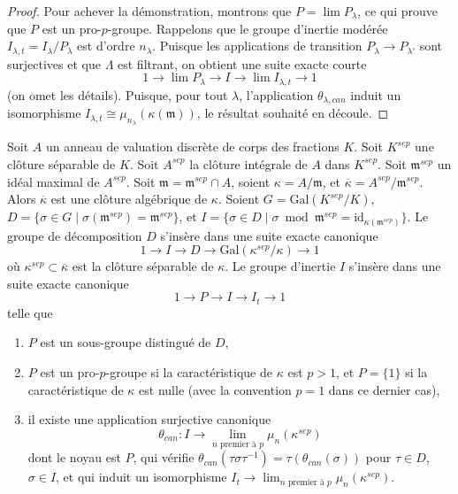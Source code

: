 \begin{proof}
\medskip\noindent
Pour achever la démonstration, montrons que $P = \lim P_\lambda$, ce qui prouve
que $P$ est un pro-$p$-groupe. Rappelons que le groupe d'inertie modérée
$I_{\lambda, t} = I_\lambda/P_\lambda$ est d'ordre $n_\lambda$.
Puisque les applications de transition $P_\lambda \to P_{\lambda'}$ sont surjectives
et que $\Lambda$ est filtrant, on obtient une suite exacte courte
$$
1 \to \lim P_\lambda \to I \to \lim I_{\lambda, t} \to 1
$$
(on omet les détails). Puisque, pour tout $\lambda$, l'application $\theta_{\lambda, can}$
induit un isomorphisme
$I_{\lambda, t} \cong \mu_{n_\lambda}(\kappa(\mathfrak m))$,
le résultat souhaité en découle.
\end{proof}

\begin{lemma}
\label{lemma-structure-decomposition-separable-closure}
Soit $A$ un anneau de valuation discrète de corps des fractions $K$.
Soit $K^{sep}$ une clôture séparable de $K$.
Soit $A^{sep}$ la clôture intégrale de $A$ dans $K^{sep}$.
Soit $\mathfrak m^{sep}$ un idéal maximal de $A^{sep}$.
Soit $\mathfrak m = \mathfrak m^{sep} \cap A$, soient
$\kappa = A/\mathfrak m$, et
$\overline{\kappa} = A^{sep}/\mathfrak m^{sep}$.
Alors $\overline{\kappa}$ est une clôture algébrique de $\kappa$.
Soient $G = \text{Gal}(K^{sep}/K)$,
$D = \{\sigma \in G \mid \sigma(\mathfrak m^{sep}) = \mathfrak m^{sep}\}$, et
$I = \{\sigma \in D \mid \sigma \bmod \mathfrak m^{sep} =
\text{id}_{\kappa(\mathfrak m^{sep})}\}$.
Le groupe de décomposition $D$ s'insère dans une suite exacte canonique
$$
1 \to I \to D \to \text{Gal}(\kappa^{sep}/\kappa) \to 1
$$
où $\kappa^{sep} \subset \overline{\kappa}$ est la clôture
séparable de $\kappa$.
Le groupe d'inertie $I$ s'insère dans une suite exacte canonique
$$
1 \to P \to I \to I_t \to 1
$$
telle que
\begin{enumerate}
\item $P$ est un sous-groupe distingué de $D$,
\item $P$ est un pro-$p$-groupe si la caractéristique de
$\kappa$ est $p > 1$, et $P = \{1\}$ si la caractéristique de $\kappa$
est nulle (avec la convention $p = 1$ dans ce dernier cas),
\item il existe une application surjective canonique
$$
\theta_{can} : I \to \lim_{n\text{ premier à }p} \mu_n(\kappa^{sep})
$$
dont le noyau est $P$, qui vérifie
$\theta_{can}(\tau \sigma \tau^{-1}) = \tau(\theta_{can}(\sigma))$
pour $\tau \in D$, $\sigma \in I$, et qui induit un isomorphisme
$I_t \to \lim_{n\text{ premier à }p} \mu_n(\kappa^{sep})$.
\end{enumerate}
\end{lemma}

